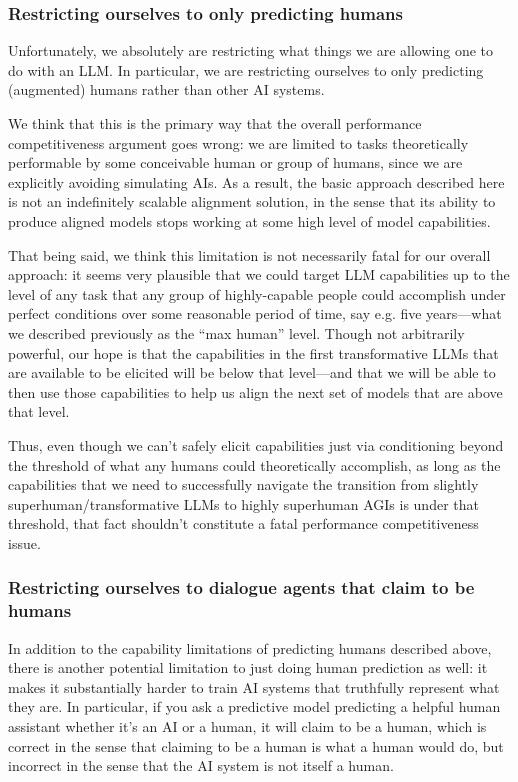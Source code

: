 \documentclass[
  onecolumn,
  nonatbib,
]{miri-tech-article}
\begin{document}
\subsubsection{Restricting ourselves to only predicting humans}

Unfortunately, we absolutely are restricting what things we are allowing one to do with an LLM. In particular, we are restricting ourselves to only predicting (augmented) humans rather than other AI systems.

We think that this is the primary way that the overall performance competitiveness argument goes wrong: we are limited to tasks theoretically performable by some conceivable human or group of humans, since we are explicitly avoiding simulating AIs. As a result, the basic approach described here is not an indefinitely scalable alignment solution, in the sense that its ability to produce aligned models stops working at some high level of model capabilities.

That being said, we think this limitation is not necessarily fatal for our overall approach: it seems very plausible that we could target LLM capabilities up to the level of any task that any group of highly-capable people could accomplish under perfect conditions over some reasonable period of time, say e.g. five years---what we described previously as the ``max human'' level. Though not arbitrarily powerful, our hope is that the capabilities in the first transformative LLMs that are available to be elicited will be below that level---and that we will be able to then use those capabilities to help us align the next set of models that are above that level.

Thus, even though we can't safely elicit capabilities just via conditioning beyond the threshold of what any humans could theoretically accomplish, as long as the capabilities that we need to successfully navigate the transition from slightly superhuman/transformative LLMs to highly superhuman AGIs is under that threshold, that fact shouldn't constitute a fatal performance competitiveness issue.


\subsubsection{Restricting ourselves to dialogue agents that claim to be humans}\label{subsubsec:restricting_ourselves_to_dialogue_agents_that_claim_to_be_humans}

In addition to the capability limitations of predicting humans described above, there is another potential limitation to just doing human prediction as well: it makes it substantially harder to train AI systems that truthfully represent what they are. In particular, if you ask a predictive model predicting a helpful human assistant whether it's an AI or a human, it will claim to be a human, which is correct in the sense that claiming to be a human is what a human would do, but incorrect in the sense that the AI system is not itself a human.
\end{document}
